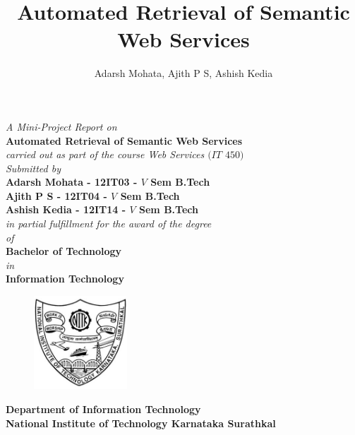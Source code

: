 \documentclass[12pt, oneside]{book}
\title{Automated Retrieval of Semantic Web Services}
\author{Adarsh Mohata, Ajith P S, Ashish Kedia}
\begin{document}
\begin{titlepage}
 \begin{center}
	\emph{A Mini-Project Report on} \\
\vspace{1cm}
\large
\textbf{Automated Retrieval of Semantic Web Services} \\
\normalsize
\vspace{1cm}
\emph{carried out as part of the course Web Services $(IT$ $450)$} \\
\vspace{1cm}
\emph{Submitted by} \\
\vspace{1cm}
\textbf{Adarsh Mohata - 12IT03 - $V$ Sem B.Tech} \\
\vspace{4mm}
\textbf{Ajith P S - 12IT04 - $V$ Sem B.Tech} \\
\vspace{4mm}
\textbf{Ashish Kedia - 12IT14 - $V$ Sem B.Tech} \\
\vspace{1cm}
\emph{in partial fulfillment for the award of the degree} \\
\vspace{7mm}
\emph{of} \\
\vspace{7mm}
\textbf{Bachelor of Technology} \\
\vspace{7mm}
\emph{in} \\
\vspace{7mm}
\textbf{Information Technology}
\vspace{1cm}
\begin{figure}[H]
	\centering
	\includegraphics[height=3.5cm]{pics/nitk_logo.jpg}
\end{figure}
\vspace{1cm}
\textbf{Department of Information Technology} \\
\vspace{5mm}
\textbf{National Institute of Technology Karnataka Surathkal} \\
\vspace{5mm}
\end{center}
\end{titlepage}
\end{document}
